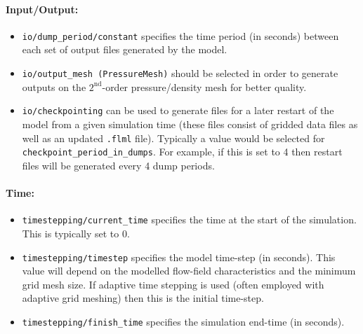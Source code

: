 \documentclass[10pt,a4paper]{article}
\begin{document}
\paragraph{Input/Output:}
\begin{itemize}
\item \texttt{io/dump\_period/constant} specifies the time period (in seconds) between each set of output files generated by the model.
\item \texttt{io/output\_mesh (PressureMesh)} should be selected in order to generate outputs on the $2^{\mathrm{nd}}$-order pressure/density mesh for better quality.
\item \texttt{io/checkpointing} can be used to generate files for a later restart of the model from a given simulation time (these files consist of gridded data files as well as an updated \texttt{.flml} file). Typically a value would be selected for \texttt{checkpoint\_period\_in\_dumps}. For example, if this is set to 4 then restart files will be generated every 4 dump periods.
\end{itemize}

\paragraph{Time:}
\begin{itemize}
\item \texttt{timestepping/current\_time} specifies the time at the start of the simulation. This is typically set to 0.
\item \texttt{timestepping/timestep} specifies the model time-step (in seconds). This value will depend on the modelled flow-field characteristics and the minimum grid mesh size. If adaptive time stepping is used (often employed with adaptive grid meshing) then this is the initial time-step.
\item \texttt{timestepping/finish\_time} specifies the simulation end-time (in seconds).
\end{itemize}
\end{document}
